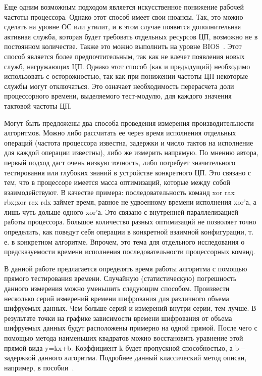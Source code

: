 Еще одним возможным подходом является искусственное понижение рабочей частоты процессора. Однако этот способ имеет свои нюансы. Так, это можно сделать на уровне ОС или утилит, и в этом случае появится дополнительная активная служба, которая будет требовать отдельных ресурсов ЦП, возможно не в постоянном количестве. Также это можно выполнить на уровне BIOS~\cite{src63}. Этот способ является более предпочтительным, так как не влечет появления новых служб, нагружающих ЦП. Однако этот способ (как и предыдущий) необходимо использовать с осторожностью, так как при понижении частоты ЦП некоторые службы могут отключаться. Это означает необходимость перерасчета доли процессорного времени, выделяемого тест-модулю, для каждого значения тактовой частоты ЦП.

Могут быть предложены два способа проведения измерения производительности алгоритмов. Можно либо рассчитать ее через время исполнения отдельных операций (частота процессора известна, задержки и число тактов на исполнение для каждой операции известны), либо же измерить напрямую. По мнению автора, первый подход даст очень низкую точность, либо потребует значительного тестирования или глубоких знаний в устройстве конкретного ЦП. Это связано с тем, что в процессоре имеется масса оптимизаций, которые между собой взаимодействуют. В качестве примера: последовательность команд xor rax rbx;xor rcx rdx займет время, равное не удвоенному времени исполнения xor’а, а лишь чуть дольше одного xor’а. Это связано с внутренней параллелизацией работы процессора. Большое количество разных оптимизаций не позволяет точно определить, как поведут себя операции в конкретной взаимной конфигурации, т. е. в конкретном алгоритме. Впрочем, это тема для отдельного исследования о предсказуемости времени исполнения последовательности процессорных команд.

В данной работе предлагается определять время работы алгоритма с помощью прямого тестирования времени. Случайную (статистическую) погрешность данного измерения можно уменьшить следующим способом. Произвести несколько серий измерений времени шифрования для различного объема шифруемых данных. Чем больше серий и измерений внутри серии, тем лучше. В результате точки на графике зависимости времени шифрования от объема шифруемых данных будут расположены примерно на одной прямой. После чего с помощью метода наименьших квадратов можно восстановить уравнение этой прямой вида y=kx+b. Коэффициент k будет пропускной способностью, а b – задержкой данного алгоритма. Подробнее данный классический метод описан, например, в пособии~\cite{src64}.

